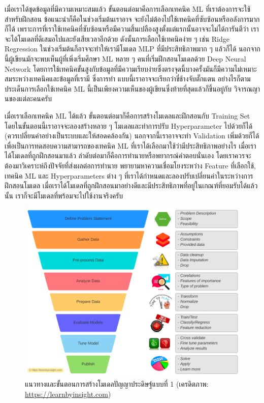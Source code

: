 เมื่อเราได้ชุดข้อมูลที่มีความเหมาะสมแล้ว ขั้นตอนต่อมาคือการเลือกเทคนิค ML ที่เราต้องการจะใช้สำหรับฝึกสอน ข้อแนะนำก็คือในช่วงเริ่มต้นเราอาจ%
จะยังไม่ต้องไปใช้เทคนิคที่ซับซ้อนหรืออลังการมากก็ได้ เพราะการที่เราใช้เทคนิคที่ซับซ้อนหรือมีความสิ้นเปลืองสูงตั้งแต่แรกนั้นอาจจะไม่ได้การันตีว่า%
เราจะได้โมเดลที่ดีเสมอไปและยังเสียเวลาอีกด้วย ดังนั้นการเลือกใช้เทคนิคง่าย ๆ เช่น Ridge Regression ในช่วงเริ่มต้นก็อาจจะทำให้เรามีโมเดล 
MLP ที่มีประสิทธิภาพมาก ๆ แล้วก็ได้ นอกจากนี้ผู้เขียนมักจะพบเห็นผู้ที่เพิ่งเริ่มศึกษา ML หลาย ๆ คนที่เริ่มฝึกสอนโมเดลด้วย Deep Neural 
Network โดยการใช้เทคนิคขั้นสูงกับข้อมูลที่มีความเรียบง่ายซึ่งตรงจุดนี้บางครั้งมันก็มีความไม่เหมาะสมระหว่างเทคนิคและข้อมูลที่เรามี ซึ่งการทำ%
แบบนี้เราอาจจะเรียกว่าขี่ช้างจับตั๊กแตน อย่างไรก็ตามประเด็นการเลือกใช้เทคนิค ML นี้เป็นเพียงความเห็นของผู้เขียนซึ่งท้ายที่สุดแล้วก็ขึ้นอยู่กับ%
วิจารณญานของแต่ละคนครับ

เมื่อเราเลือกเทคนิค ML ได้แล้ว ขั้นตอนต่อมาก็คือการสร้างโมเดลและฝึกสอนกับ Training Set โดยในขั้นตอนนี้เราอาจจะลองสร้างหลาย ๆ 
โมเดลและทำการปรับ Hyperparameter ไปด้วยก็ได้ (ควรเปลี่ยนค่าอย่างเป็นระบบและให้สอดคล้องกัน) นอกจากนี้เราอาจจะทำ Validation 
เพิ่มด้วยก็ได้เพื่อเป็นการทดสอบความสามารถของเทคนิค ML ที่เราได้เลือกมาใช้ว่ามีประสิทธิภาพอย่างไร เมื่อเราได้โมเดลที่ถูกฝึกสอนมาแล้ว 
ลำดับต่อมาก็คือการทำนายหรือพยากรณ์คำตอบนั่นเอง โดยเราควรจะต้องมาวิเคราะห์ถึงปัจจัยที่ส่งผลต่อการทำนาย พยายามหาความเชื่อมโยงระหว่าง 
Feature ที่เลือกใช้, เทคนิค ML และ Hyperparameters ต่าง ๆ ที่เราได้กำหนดและลองปรับเปลี่ยนค่าในระหว่างการฝึกสอนโมเดล 
เมื่อเราได้โมเดลที่ถูกฝึกสอนมาอย่างดีและมีประสิทธิภาพที่อยู่ในเกณฑ์ที่ยอมรับได้แล้วนั้น เราก็จะมีโมเดลที่พร้อมจะไปใช้งานจริงครับ

\begin{figure}[htbp]
    \centering
    \includegraphics[width=\linewidth]{fig/ml_workflow.png}
    \caption{แนวทางและขั้นตอนการสร้างโมเดลปัญญาประดิษฐ์แบบที่ 1 (เครดิตภาพ: \url{https://learnbyinsight.com})}
    \label{fig:ml_workflow}
\end{figure}

